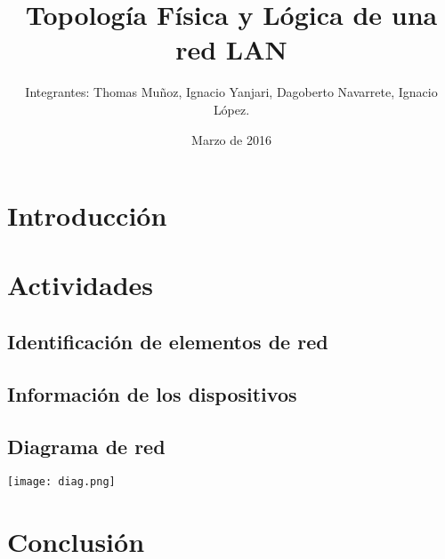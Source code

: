 \documentclass{udpreport}
\title{Topología Física y Lógica de una red LAN}
\author{Integrantes: Thomas Muñoz, Ignacio Yanjari, Dagoberto Navarrete, Ignacio López.}
\date{Marzo de 2016}
\begin{document}
\maketitle
\tableofcontents %
\chapter{Introducción}
\chapter{Actividades}
\section{Identificación de elementos de red}
\section{Información de los dispositivos}
\section{Diagrama de red}
\texttt{[image: diag.png]}
\chapter{Conclusión}
\end{document}
